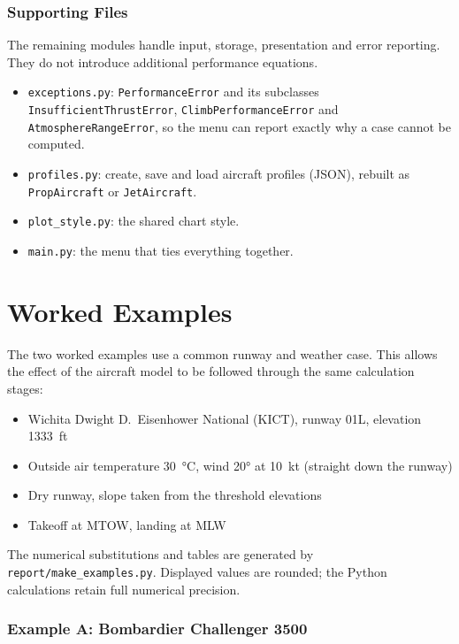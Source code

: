 \documentclass[11pt,letterpaper]{article}
\numberwithin{equation}{section}
\newcommand{\code}[1]{\textmd{\texttt{#1}}}
\begin{document}
\section{Supporting Files}\label{sec:support}
The remaining modules handle input, storage, presentation and error reporting. They do not introduce additional performance equations.
\begin{itemize}\raggedright
\item \code{exceptions.py}: \code{PerformanceError} and its subclasses \code{InsufficientThrustError}, \code{ClimbPerformanceError} and \code{AtmosphereRangeError}, so the menu can report exactly why a case cannot be computed.
\item \code{profiles.py}: create, save and load aircraft profiles (JSON), rebuilt as \code{PropAircraft} or \code{JetAircraft}.
\item \code{plot\_style.py}: the shared chart style.
\item \code{main.py}: the menu that ties everything together.
\end{itemize}

\clearpage
\part{Worked Examples}

The two worked examples use a common runway and weather case. This allows the effect of the aircraft model to be followed through the same calculation stages:
\begin{itemize}
\item Wichita Dwight D.\ Eisenhower National (KICT), runway 01L, elevation \SI{1333}{ft}
\item Outside air temperature \SI{30}{\celsius}, wind \ang{20} at \SI{10}{kt} (straight down the runway)
\item Dry runway, slope taken from the threshold elevations
\item Takeoff at MTOW, landing at MLW
\end{itemize}
The numerical substitutions and tables are generated by \code{report/make\_examples.py}. Displayed values are rounded; the Python calculations retain full numerical precision.

\clearpage
\section{Example A: Bombardier Challenger 3500}\label{sec:exA}

\end{document}
